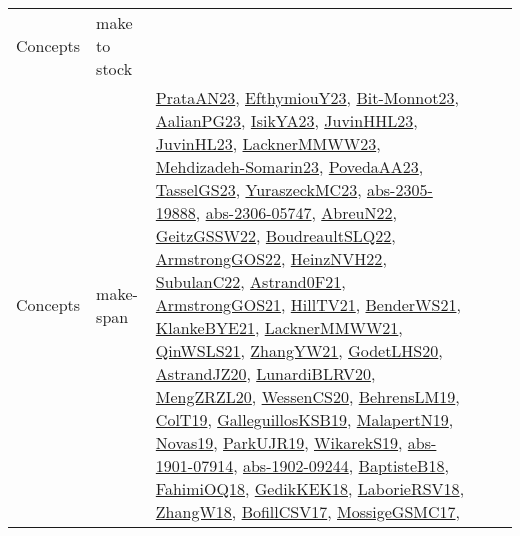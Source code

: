 {\begin{longtable}{lp{3cm}>{\raggedright}p{6cm}>{\raggedright}p{6cm}p{8cm}}
Concepts & make to stock &  &  & \\
Concepts & make-span & \href{articles/PrataAN23.pdf}{PrataAN23}\cite{PrataAN23}, \href{papers/EfthymiouY23.pdf}{EfthymiouY23}\cite{EfthymiouY23}, \href{papers/Bit-Monnot23.pdf}{Bit-Monnot23}\cite{Bit-Monnot23}, \href{papers/AalianPG23.pdf}{AalianPG23}\cite{AalianPG23}, \href{articles/IsikYA23.pdf}{IsikYA23}\cite{IsikYA23}, \href{papers/JuvinHHL23.pdf}{JuvinHHL23}\cite{JuvinHHL23}, \href{papers/JuvinHL23.pdf}{JuvinHL23}\cite{JuvinHL23}, \href{articles/LacknerMMWW23.pdf}{LacknerMMWW23}\cite{LacknerMMWW23}, \href{papers/Mehdizadeh-Somarin23.pdf}{Mehdizadeh-Somarin23}\cite{Mehdizadeh-Somarin23}, \href{papers/PovedaAA23.pdf}{PovedaAA23}\cite{PovedaAA23}, \href{papers/TasselGS23.pdf}{TasselGS23}\cite{TasselGS23}, \href{papers/YuraszeckMC23.pdf}{YuraszeckMC23}\cite{YuraszeckMC23}, \href{articles/abs-2305-19888.pdf}{abs-2305-19888}\cite{abs-2305-19888}, \href{articles/abs-2306-05747.pdf}{abs-2306-05747}\cite{abs-2306-05747}, \href{articles/AbreuN22.pdf}{AbreuN22}\cite{AbreuN22}, \href{papers/GeitzGSSW22.pdf}{GeitzGSSW22}\cite{GeitzGSSW22}, \href{papers/BoudreaultSLQ22.pdf}{BoudreaultSLQ22}\cite{BoudreaultSLQ22}, \href{papers/ArmstrongGOS22.pdf}{ArmstrongGOS22}\cite{ArmstrongGOS22}, \href{articles/HeinzNVH22.pdf}{HeinzNVH22}\cite{HeinzNVH22}, \href{articles/SubulanC22.pdf}{SubulanC22}\cite{SubulanC22}, \href{papers/Astrand0F21.pdf}{Astrand0F21}\cite{Astrand0F21}, \href{papers/ArmstrongGOS21.pdf}{ArmstrongGOS21}\cite{ArmstrongGOS21}, \href{papers/HillTV21.pdf}{HillTV21}\cite{HillTV21}, \href{papers/BenderWS21.pdf}{BenderWS21}\cite{BenderWS21}, \href{papers/KlankeBYE21.pdf}{KlankeBYE21}\cite{KlankeBYE21}, \href{papers/LacknerMMWW21.pdf}{LacknerMMWW21}\cite{LacknerMMWW21}, \href{articles/QinWSLS21.pdf}{QinWSLS21}\cite{QinWSLS21}, \href{articles/ZhangYW21.pdf}{ZhangYW21}\cite{ZhangYW21}, \href{papers/GodetLHS20.pdf}{GodetLHS20}\cite{GodetLHS20}, \href{articles/AstrandJZ20.pdf}{AstrandJZ20}\cite{AstrandJZ20}, \href{articles/LunardiBLRV20.pdf}{LunardiBLRV20}\cite{LunardiBLRV20}, \href{articles/MengZRZL20.pdf}{MengZRZL20}\cite{MengZRZL20}, \href{papers/WessenCS20.pdf}{WessenCS20}\cite{WessenCS20}, \href{papers/BehrensLM19.pdf}{BehrensLM19}\cite{BehrensLM19}, \href{papers/ColT19.pdf}{ColT19}\cite{ColT19}, \href{papers/GalleguillosKSB19.pdf}{GalleguillosKSB19}\cite{GalleguillosKSB19}, \href{papers/MalapertN19.pdf}{MalapertN19}\cite{MalapertN19}, \href{articles/Novas19.pdf}{Novas19}\cite{Novas19}, \href{papers/ParkUJR19.pdf}{ParkUJR19}\cite{ParkUJR19}, \href{articles/WikarekS19.pdf}{WikarekS19}\cite{WikarekS19}, \href{articles/abs-1901-07914.pdf}{abs-1901-07914}\cite{abs-1901-07914}, \href{articles/abs-1902-09244.pdf}{abs-1902-09244}\cite{abs-1902-09244}, \href{articles/BaptisteB18.pdf}{BaptisteB18}\cite{BaptisteB18}, \href{articles/FahimiOQ18.pdf}{FahimiOQ18}\cite{FahimiOQ18}, \href{articles/GedikKEK18.pdf}{GedikKEK18}\cite{GedikKEK18}, \href{articles/LaborieRSV18.pdf}{LaborieRSV18}\cite{LaborieRSV18}, \href{articles/ZhangW18.pdf}{ZhangW18}\cite{ZhangW18}, \href{papers/BofillCSV17.pdf}{BofillCSV17}\cite{BofillCSV17}, \href{papers/MossigeGSMC17.pdf}{MossigeGSMC17}\cite{MossigeGSMC17}, 
\end{longtable}}
